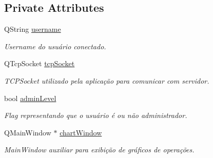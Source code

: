 \subsection*{Private Attributes}
\begin{DoxyCompactItemize}
\item 
Q\+String \hyperlink{classMyCalcWindow_aaa828b24dd233138d200de623762e95c}{username}\hypertarget{classMyCalcWindow_aaa828b24dd233138d200de623762e95c}{}\label{classMyCalcWindow_aaa828b24dd233138d200de623762e95c}

\begin{DoxyCompactList}\small\item\em Username do usuário conectado. \end{DoxyCompactList}\item 
Q\+Tcp\+Socket \hyperlink{classMyCalcWindow_aa07c81871dc4b11ab83324b544d66733}{tcp\+Socket}\hypertarget{classMyCalcWindow_aa07c81871dc4b11ab83324b544d66733}{}\label{classMyCalcWindow_aa07c81871dc4b11ab83324b544d66733}

\begin{DoxyCompactList}\small\item\em T\+C\+P\+Socket utilizado pela aplicação para comunicar com servidor. \end{DoxyCompactList}\item 
bool \hyperlink{classMyCalcWindow_a80f22185e35ea4a28825b0d2518df67c}{admin\+Level}\hypertarget{classMyCalcWindow_a80f22185e35ea4a28825b0d2518df67c}{}\label{classMyCalcWindow_a80f22185e35ea4a28825b0d2518df67c}

\begin{DoxyCompactList}\small\item\em Flag representando que o usuário é ou não administrador. \end{DoxyCompactList}\item 
Q\+Main\+Window $\ast$ \hyperlink{classMyCalcWindow_a98ecf548e0cb3586ff4afc33bdfacb7a}{chart\+Window}\hypertarget{classMyCalcWindow_a98ecf548e0cb3586ff4afc33bdfacb7a}{}\label{classMyCalcWindow_a98ecf548e0cb3586ff4afc33bdfacb7a}

\begin{DoxyCompactList}\small\item\em Main\+Window auxiliar para exibição de gráficos de operações. \end{DoxyCompactList}\end{DoxyCompactItemize}
